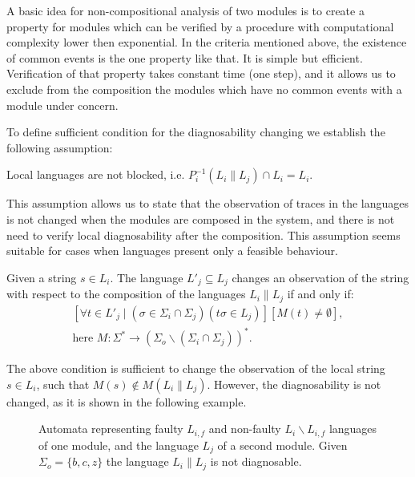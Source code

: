 \documentclass[a4paper,oneside]{article}
\begin{document}
A basic idea for non-compositional analysis of two modules is to create a
property for modules which can be verified by a procedure with computational
complexity lower then exponential. In the criteria mentioned above, the
existence of common events is the one property like that. It is simple but
efficient. Verification of that property takes constant time (one step), and it
allows us to exclude from the composition the modules which have no
common events with a module under concern.

To define sufficient condition for the diagnosability changing we establish the
following assumption:

\begin{assumption}
Local languages are not blocked, i.e. 
$P^{-1}_i(L_i \parallel L_j)\cap L_i = L_i$.
\end{assumption}

This assumption allows us to state that the observation of traces in the
languages is not changed when the modules are composed in the system, and there
is not need to verify local diagnosability after the composition.
This assumption seems suitable for cases when languages present only a feasible
behaviour.

\begin{conjecture}
\label{cnj_changed_observation}
Given a string $ s \in L_i$. The language $L'_j \subseteq L_j$ changes an observation
of the string with respect to the composition of the languages $L_i \parallel L_j$
if and only if:
$$
\begin{array}{l}
	[
		\forall t \in L'_j \mid (\sigma \in \Sigma_i \cap \Sigma_j)
		(t\sigma \in L_j)
	]
	[M(t) \neq \emptyset],
	\\[1ex]
	\textrm{here } M: \Sigma^* \rightarrow 
	(\Sigma_o \backslash (\Sigma_i \cap	\Sigma_j))^*.
\end{array}
$$
\end{conjecture}

The above condition is sufficient to change the observation of the local string
$s \in L_i$, such that $M(s) \not \in M(L_i \parallel L_j)$. However, the
diagnosability is not changed, as it is shown in the following example.

\begin{figure}[t]
\centering

\caption{Automata representing faulty $L_{i,f}$ and
non-faulty $L_i \backslash L_{i,f}$ languages of one module, and the language
$L_j$ of a second module. Given $\Sigma_o = \{b, c, z\}$ the language $L_i
\parallel L_j$ is not diagnosable.}
\label{fig_changed_observation}
\end{figure}
\end{document}
